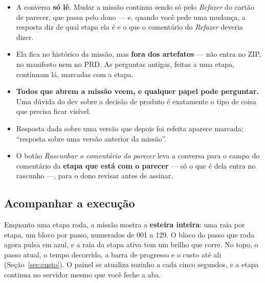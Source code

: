 \documentclass[11pt,a4paper]{article}
\begin{document}
\begin{itemize}
  \item A conversa \textbf{só lê}. Mudar a missão continua sendo só pelo \emph{Refazer} do cartão de parecer, que passa pelo dono --- e, quando você pede uma mudança, a resposta diz de qual etapa ela é e o que o comentário do \emph{Refazer} deveria dizer.
  \item Ela fica no histórico da missão, mas \textbf{fora dos artefatos} --- não entra no ZIP, no manifesto nem no PRD. As perguntas antigas, feitas a uma etapa, continuam lá, marcadas com a etapa.
  \item \textbf{Todos que abrem a missão veem, e qualquer papel pode perguntar.} Uma dúvida do dev sobre a decisão de produto é exatamente o tipo de coisa que precisa ficar visível.
  \item Resposta dada sobre uma versão que depois foi refeita aparece marcada: ``resposta sobre uma versão anterior da missão''.
  \item O botão \emph{Rascunhar o comentário do parecer} leva a conversa para o campo do comentário da \textbf{etapa que está com o parecer} --- só o que é dela entra no rascunho ---, para o dono revisar antes de assinar.
\end{itemize}

\subsection{Acompanhar a execução}
\label{sec:acompanhar}

Enquanto uma etapa roda, a missão mostra a \textbf{esteira inteira}: uma raia por etapa, um bloco por passo, numerados de 001 a 129. O bloco do passo que roda agora pulsa em azul, e a raia da etapa ativa tem um brilho que corre. No topo, o passo atual, o tempo decorrido, a barra de progresso e o custo até ali (Seção~\ref{sec:custo}). O painel se atualiza sozinho a cada cinco segundos, e a etapa continua no servidor mesmo que você feche a aba.
\end{document}

